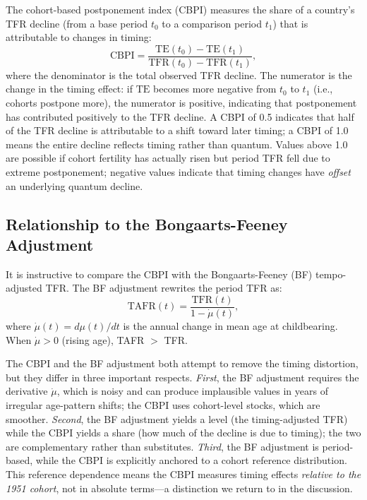 \documentclass[12pt]{article}
\begin{document}
The cohort-based postponement index (CBPI) measures the share of a
country's TFR decline (from a base period $t_0$ to a comparison
period $t_1$) that is attributable to changes in timing:
\begin{equation}
    \mathrm{CBPI} = \frac{\mathrm{TE}(t_0) - \mathrm{TE}(t_1)}
                         {\mathrm{TFR}(t_0) - \mathrm{TFR}(t_1)},
    \label{eq:CBPI}
\end{equation}
where the denominator is the total observed TFR decline.  The
numerator is the change in the timing effect: if $\mathrm{TE}$ becomes
more negative from $t_0$ to $t_1$ (i.e., cohorts postpone more), the
numerator is positive, indicating that postponement has contributed
positively to the TFR decline.  A CBPI of 0.5 indicates that half of
the TFR decline is attributable to a shift toward later timing; a CBPI
of 1.0 means the entire decline reflects timing rather than quantum.
Values above 1.0 are possible if cohort fertility has actually
risen but period TFR fell due to extreme postponement; negative values
indicate that timing changes have \emph{offset} an underlying quantum
decline.

\subsection{Relationship to the Bongaarts-Feeney Adjustment}

It is instructive to compare the CBPI with the Bongaarts-Feeney (BF)
tempo-adjusted TFR.  The BF adjustment rewrites the period TFR as:
\begin{equation}
    \mathrm{TAFR}(t) = \frac{\mathrm{TFR}(t)}{1 - \dot{\mu}(t)},
    \label{eq:BF}
\end{equation}
where $\dot{\mu}(t) = d\mu(t)/dt$ is the annual change in mean age at
childbearing.  When $\dot{\mu} > 0$ (rising age), TAFR $>$ TFR.

The CBPI and the BF adjustment both attempt to remove the timing
distortion, but they differ in three important respects.  \emph{First},
the BF adjustment requires the derivative $\dot{\mu}$, which is
noisy and can produce implausible values in years of irregular age-pattern
shifts; the CBPI uses cohort-level stocks, which are smoother.
\emph{Second}, the BF adjustment yields a level (the timing-adjusted
TFR) while the CBPI yields a share (how much of the decline is due to
timing); the two are complementary rather than substitutes.
\emph{Third}, the BF adjustment is period-based, while the CBPI is
explicitly anchored to a cohort reference distribution.  This
reference dependence means the CBPI measures timing effects
\emph{relative to the 1951 cohort}, not in absolute terms---a
distinction we return to in the discussion.
\end{document}
